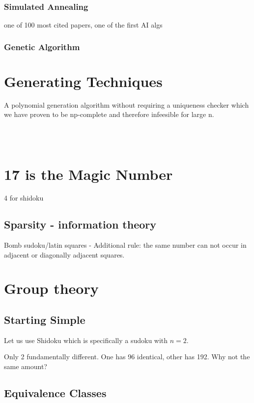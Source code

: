 \documentclass[a4paper,12pt]{article}
\begin{document}
		\subsubsection{Simulated Annealing} 
		\cite{simulated annealing} one of 100 most cited papers, one of the first AI algs
		\subsubsection{Genetic Algorithm}
\section{Generating  Techniques}

	A polynomial generation algorithm without requiring a uniqueness checker which we have proven to be np-complete and therefore infeesible for large n.
	
~~~~~~~~~~~~~~~~~~~~~~~~~~~~~~~~~~~~~~~~~~~~~~~~~~~~~~~~~~~~~~~~~~~~~~~~~~~~~~ %
\section{17 is the Magic Number}

	4 for shidoku
	\subsection{Sparsity - information theory}
		Bomb sudoku/latin squares - Additional rule: the same number can not occur in adjacent or diagonally adjacent squares.
		
\section{Group theory}
	\subsection{Starting Simple}
		Let us use Shidoku which is specifically a sudoku with $n=2$.

		Only 2 fundamentally different.
		One has 96 identical, other has 192. Why not the same amount?
		
	\subsection{Equivalence Classes}
	
\end{document}
